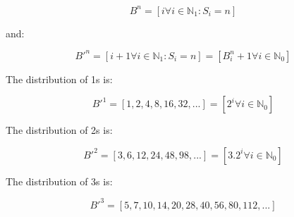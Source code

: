 \documentclass{article}
\begin{document}
\begin{displaymath}
B^n = [i \forall i \in \mathbb{N}_{1} : S_i = n]
\end{displaymath}

\noindent
and:

\begin{displaymath}
B'^n
= [i+1 \forall i \in \mathbb{N}_{1} : S_i = n]
= [B^n_i + 1 \forall i \in \mathbb{N}_{0}]
\end{displaymath}

\noindent
The distribution of 1s is:

\begin{displaymath}
B'^1
= [1, 2, 4, 8, 16, 32, ...]
= [2^i \forall i \in \mathbb{N}_{0}]
\end{displaymath}

\noindent
The distribution of 2s is:

\begin{displaymath}
B'^2
= [3, 6, 12, 24, 48, 98, ...]
= [3.2^i \forall i \in \mathbb{N}_{0}]
\end{displaymath}

\noindent
The distribution of 3s is:

\begin{displaymath}
B'^3
= [5, 7, 10, 14, 20, 28, 40, 56, 80, 112, ...]
\end{displaymath}
\end{document}
